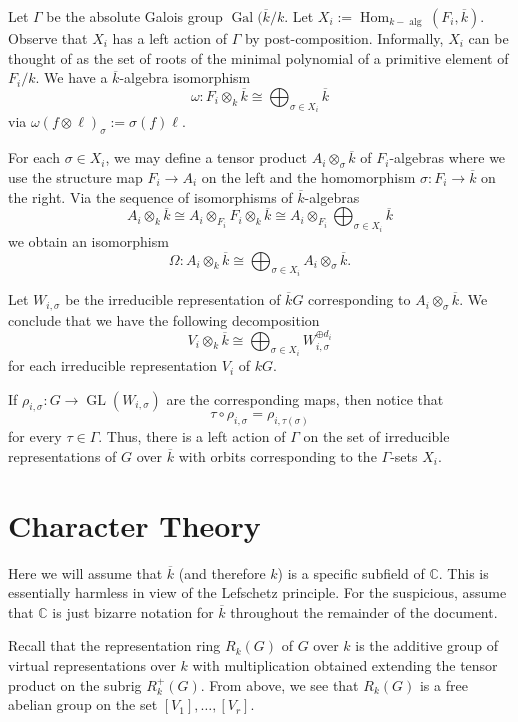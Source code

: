 \documentclass[12pt]{article}
\theoremstyle{plain}
\theoremstyle{definition}
\theoremstyle{remark}
\numberwithin{equation}{section}
\begin{document}
Let $\Gamma$ be the absolute Galois group
$\operatorname{Gal}(\overline{k}/k$.
Let $X_i :=
\operatorname{Hom}_{k-\operatorname{alg}}(F_i,\overline{k})$.
Observe that $X_i$ has a left action of $\Gamma$ by
post-composition.
Informally, $X_i$ can be thought of as the set of roots of the minimal
polynomial of a primitive element of $F_i/k$.
We have a $\overline{k}$-algebra isomorphism
\[
\omega : F_i \otimes_k \overline{k} \cong
\bigoplus_{\sigma \in X_i} \overline{k}
\]
via $\omega(f \otimes \ell)_{\sigma} := \sigma(f)\ell$.

For each $\sigma \in X_i$, we may define a tensor product
$A_i \otimes_\sigma \overline{k}$ of $F_i$-algebras
where we use the structure map $F_i \to A_i$ on the left and
the homomorphism $\sigma : F_i \to \overline{k}$ on the right.
Via the sequence of isomorphisms of $\overline{k}$-algebras
\[
A_i \otimes_k \overline{k} \cong 
A_i \otimes_{F_i} F_i \otimes_k \overline{k}
\cong A_i \otimes_{F_i} \bigoplus_{\sigma \in X_i} \overline{k}
\]
we obtain an isomorphism
\[
\Omega : A_i \otimes_k \overline{k} \cong
\bigoplus_{\sigma \in X_i} A_i \otimes_\sigma \overline{k} .
\]

Let $W_{i,\sigma}$ be the irreducible representation
of $\overline{k}G$ corresponding to $A_i \otimes_\sigma \overline{k}$.
We conclude that we have the following decomposition
\[
V_i \otimes_k \overline{k} \cong
\bigoplus_{\sigma \in X_i} W_{i,\sigma}^{\oplus d_i}
\]
for each irreducible representation $V_i$ of $kG$.

If $\rho_{i,\sigma} : G \to \operatorname{GL}(W_{i,\sigma})$ are
the corresponding maps, then notice that
\[
\tau \circ \rho_{i,\sigma} = \rho_{i,\tau(\sigma)}
\]
for every $\tau \in \Gamma$.
Thus, there is a left action of $\Gamma$ on the set of irreducible
representations of $G$ over $\overline{k}$
with orbits corresponding to the $\Gamma$-sets $X_i$.

\section{Character Theory}

Here we will assume that $\overline{k}$ (and therefore $k$)
is a specific subfield of $\mathbb{C}$.
This is essentially harmless in view of the Lefschetz principle.
For the suspicious, assume that $\mathbb{C}$ is just bizarre notation for
$\overline{k}$ throughout the remainder of the document.

Recall that the representation ring $R_k(G)$ of $G$ over $k$
is the additive group of virtual representations over $k$
with multiplication obtained extending the tensor product
on the subrig $R_k^+(G)$.
From above, we see that $R_k(G)$ is a free abelian group
on the set $[V_1],\ldots,[V_r]$.
\end{document}
